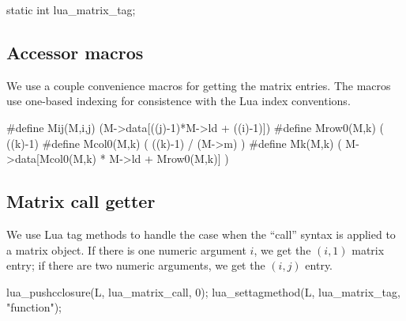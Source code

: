 \nwenddocs{}\endmoddef
static int lua_matrix_tag;

\nwendcode{}\nwdocspar


\subsection{Accessor macros}

We use a couple convenience macros for getting the matrix entries.
The macros use one-based indexing for consistence with the Lua
index conventions.

\nwenddocs{}\endmoddef
#define Mij(M,i,j) (M->data[((j)-1)*M->ld + ((i)-1)])
#define Mrow0(M,k) ( ((k)-1) %
#define Mcol0(M,k) ( ((k)-1) / (M->m) )
#define Mk(M,k)    ( M->data[Mcol0(M,k) * M->ld + Mrow0(M,k)] )

\nwendcode{}\nwdocspar

\subsection{Matrix call getter}

We use Lua tag methods to handle the case when the ``call'' syntax
is applied to a matrix object.  If there is one numeric argument $i$,
we get the $(i,1)$ matrix entry; if there are two numeric arguments,
we get the $(i,j)$ entry.

\nwenddocs{}\endmoddef
lua_pushcclosure(L, lua_matrix_call, 0);
lua_settagmethod(L, lua_matrix_tag, "function");
\nwendcode{}\nwdocspar


